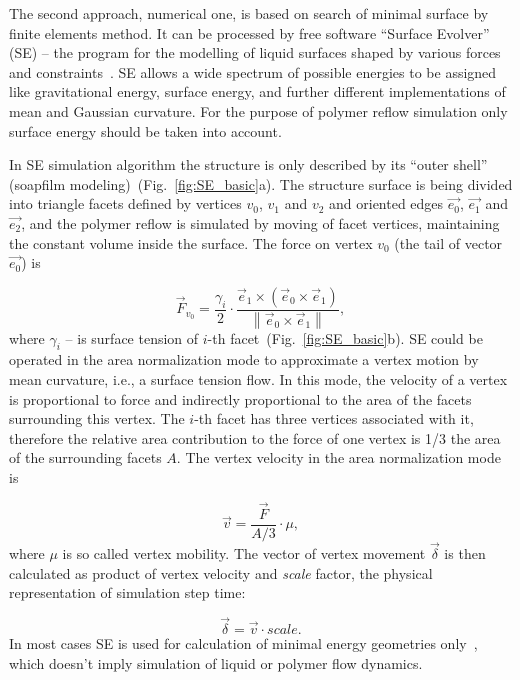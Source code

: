 The second approach, numerical one, is based on search of minimal surface by finite elements method. It can be processed by free software ``Surface Evolver'' (SE) -- the program for the modelling of liquid surfaces shaped by various forces and constraints~\cite{Brakke_SE}. SE allows a wide spectrum of possible energies to be assigned like gravitational energy, surface energy, and further different implementations of mean and Gaussian curvature. For the purpose of polymer reflow simulation only surface energy should be taken into account.

In SE simulation algorithm the structure is only described by its ``outer shell'' (soapfilm modeling)~(Fig.~\ref{fig:SE_basic}a). The structure surface is being divided into triangle facets defined by vertices $v_0$, $v_1$ and $v_2$ and oriented edges $\vec{e_0}$, $\vec{e_1}$ and $\vec{e_2}$, and the polymer reflow is simulated by moving of facet vertices, maintaining the constant volume inside the surface. The force on vertex $v_0$ (the tail of vector $\vec{e_0}$) is

\begin{equation}
	\vec{F}_{v_0}=\frac{\gamma_i}{2} \cdot \frac{\vec{e}_1 \times\left(\vec{e}_0 \times \vec{e}_1\right)}{\left\|\vec{e}_0 \times \vec{e}_1\right\|},
\end{equation}
where $\gamma_i$ -- is surface tension of $i$-th facet~(Fig.~\ref{fig:SE_basic}b). SE could be operated in the area normalization mode to approximate a vertex motion by mean curvature, i.e., a surface tension flow. In this mode, the velocity of a vertex is proportional to force and indirectly proportional to the area of the facets surrounding this vertex. The $i$-th facet has three vertices associated with it, therefore the relative area contribution to the force of one vertex is 1/3 the area of the surrounding facets $A$. The vertex velocity in the area normalization mode is

\begin{equation} \label{eq:SE_v}
	\vec{v} = \frac{\vec{F}}{A/3} \cdot \mu,
\end{equation}
where $\mu$ is so called vertex mobility. The vector of vertex movement $\vec{\delta}$ is then calculated as product of vertex velocity and \textit{scale} factor, the physical representation of simulation step time:

\begin{equation} \label{eq:SE_delta}
	\vec{\delta} = \vec{v} \cdot scale.
\end{equation}
In most cases SE is used for calculation of minimal energy geometries only~\cite{SE_example_1,SE_example_2}, which doesn't imply simulation of liquid or polymer flow dynamics.

